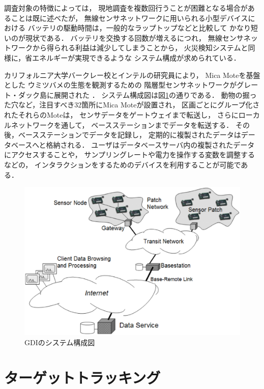 調査対象の特徴によっては，
現地調査を複数回行うことが困難となる場合があることは既に述べたが，
無線センサネットワークに用いられる小型デバイスにおける
バッテリの駆動時間は，一般的なラップトップなどと比較して
かなり短いのが現状である．
バッテリを交換する回数が増えるにつれ，
無線センサネットワークから得られる利益は減少してしまうことから，
火災検知システムと同様に，省エネルギーが実現できるような
システム構成が求められている．


カリフォルニア大学バークレー校とインテルの研究員により，
Mica Moteを基盤とした
ウミツバメの生態を観測するための
階層型センサネットワークがグレート・ダック島に展開された
\cite{Mainwaring:2002:WSN:570738.570751}．
システム構成図は図\ref{fig:gdi_system_architecture}の通りである．
動物の掘った穴など，注目すべき32箇所にMica Moteが設置され，
区画ごとにグループ化されたそれらのMoteは，
センサデータをゲートウェイまで転送し，
さらにローカルネットワークを通して，
ベースステーションまでデータを転送する．
その後，ベースステーションでデータを記録し，
定期的に複製されたデータはデータベースへと格納される．
ユーザはデータベースサーバ内の複製されたデータにアクセスすることや，
サンプリングレートや電力を操作する変数を調整するなどの，
インタラクションをするためのデバイスを利用することが可能である．

\begin{figure}[htbp]
 \begin{center}
  \includegraphics[width=120mm]{./images/gdi_system_architecture.eps}
 \end{center}
 \caption{GDIのシステム構成図}
 \label{fig:gdi_system_architecture}
\end{figure}




\section{ターゲットトラッキング}

